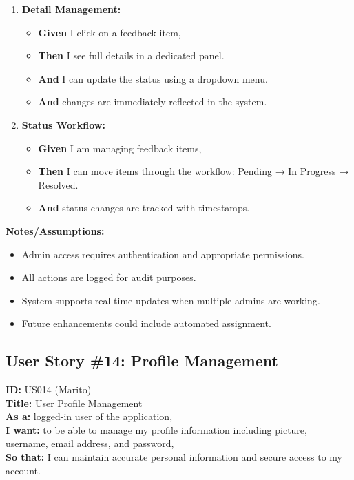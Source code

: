 \documentclass[12pt]{article}
\begin{document}
\begin{enumerate}
    \item \textbf{Detail Management:}
    \begin{itemize}
        \item \textbf{Given} I click on a feedback item,
        \item \textbf{Then} I see full details in a dedicated panel.
        \item \textbf{And} I can update the status using a dropdown menu.
        \item \textbf{And} changes are immediately reflected in the system.
    \end{itemize}

    \item \textbf{Status Workflow:}
    \begin{itemize}
        \item \textbf{Given} I am managing feedback items,
        \item \textbf{Then} I can move items through the workflow: Pending → In Progress → Resolved.
        \item \textbf{And} status changes are tracked with timestamps.
    \end{itemize}
\end{enumerate}

\vspace{1em}
\textbf{Notes/Assumptions:}
\begin{itemize}
    \item Admin access requires authentication and appropriate permissions.
    \item All actions are logged for audit purposes.
    \item System supports real-time updates when multiple admins are working.
    \item Future enhancements could include automated assignment.
\end{itemize}


\subsection{User Story \#14: Profile Management}
\textbf{ID:} US014 (Marito) \\
\textbf{Title:} User Profile Management \\
\textbf{As a:} logged-in user of the application, \\
\textbf{I want:} to be able to manage my profile information including picture, username, email address, and password, \\
\textbf{So that:} I can maintain accurate personal information and secure access to my account.
\end{document}
